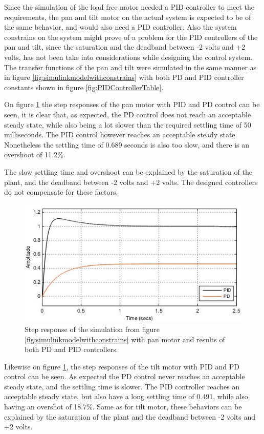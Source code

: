 Since the simulation of the load free motor needed a PID controller to meet the requirements, the pan and tilt motor on the actual system is expected to be of the same behavior, and would also need a PID controller. Also the system constrains on the system might prove of a problem for the PID controllers of the pan and tilt, since the saturation and the deadband between -2 volts and +2 volts, has not been take into considerations while designing the control system. The transfer functions of the pan and tilt were simulated in the same manner as in figure \ref{fig:simulinkmodelwithconstrains} with both PD and PID controller constants shown in figure \ref{fig:PIDControllerTable}.

On figure \ref{fig:SimuStepTiltPDAndPID} the step responses of the pan motor with PID and PD control can be seen, it is clear that, as expected, the PD control does not reach an acceptable steady state, while also being a lot slower than the required settling time of 50 milliseconds. The PID control however reaches an acceptable steady state. Nonetheless the settling time of 0.689 seconds is also too slow, and there is an overshoot of 11.2\%.

The slow settling time and overshoot can be explained by the saturation of the plant, and the deadband between -2 volts and +2 volts. The designed controllers do not compensate for these factors. 

\begin{figure}[h!]
\centering
\includegraphics[scale=0.7]{Billeder/SimuStepPanPDAndPID.jpg}
\caption{ Step response of the simulation from figure \ref{fig:simulinkmodelwithconstrains} with pan motor and results of both PD and PID controllers.
 }
\label{fig:SimuStepTiltPDAndPID}
\end{figure}

Likewise on figure \ref{fig:SimuStepTiltPDAndPID}, the step responses of the tilt motor with PID and PD control can be seen. As expected the PD control never reaches an acceptable steady state, and the settling time is slower. The PID controller reaches an acceptable steady state, but also have a long settling time of 0.491, while also having an overshot of 18.7\%.
Same as for tilt motor, these behaviors can be explained by the saturation of the plant and the deadband between -2 volts and +2 volts.


